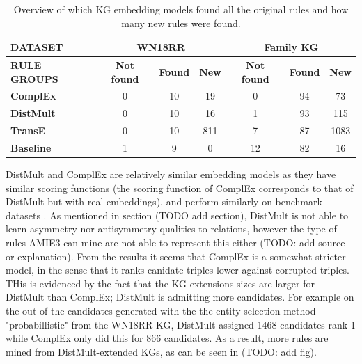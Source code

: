 \begin{table}[h]
\begin{tabular}{|l|ccc||ccc|}
\hline
{\textbf{DATASET}}   & \multicolumn{3}{c||}{\textbf{WN18RR}}                                                                              & \multicolumn{3}{c|}{\textbf{Family KG}}                                                           \\ \hline
{\textbf{RULE GROUPS}}   & \multicolumn{1}{c|}{\textbf{Not found}} & \multicolumn{1}{c|}{\textbf{Found}} & \multicolumn{1}{c||}{\textbf{New}} & \multicolumn{1}{c|}{\textbf{Not found}} & \multicolumn{1}{c|}{\textbf{Found}} & \multicolumn{1}{c|}{\textbf{New}} \\ \hline
\textbf{ComplEx}  & \multicolumn{1}{c|}{0}                  & \multicolumn{1}{c|}{10}             & \multicolumn{1}{c||}{19}           & \multicolumn{1}{c|}{0}                  & \multicolumn{1}{c|}{94}             & \multicolumn{1}{c|}{73}           \\ \hline
\textbf{DistMult} & \multicolumn{1}{c|}{0}                     & \multicolumn{1}{c|}{10}                                  & 16                                & \multicolumn{1}{c|}{1}         & \multicolumn{1}{c|}{93}          & 115                               \\ \hline
\textbf{TransE}   & \multicolumn{1}{c|}{0}         & \multicolumn{1}{c|}{10}                     & 811                               & \multicolumn{1}{c|}{7}       & \multicolumn{1}{c|}{87}      & 1083                              \\ \hline
\textbf{Baseline} & \multicolumn{1}{c|}{1}     & \multicolumn{1}{c|}{9}                   & 0                                 & \multicolumn{1}{c|}{12}       & \multicolumn{1}{c|}{82}         & 16                                \\ \hline
\end{tabular}
\caption{Overview of which KG embedding models found all the original rules and how many new rules were found.}
\end{table}

DistMult and ComplEx are relatively similar embedding models as they have similar scoring functions (the scoring function of ComplEx corresponds to that of DistMult but with real embeddings), and perform similarly on benchmark datasets \cite{complEx}. As mentioned in section (TODO add section), DistMult is not able to learn asymmetry nor antisymmetry qualities to relations, however the type of rules AMIE3 can mine are not able to represent this either (TODO: add source or explanation). From the results it seems that ComplEx is a somewhat stricter model, in the sense that it ranks canidate triples lower against corrupted triples. THis is evidenced by the fact that the KG extensions sizes are larger for DistMult than ComplEx; DistMult is admitting more candidates. For example on the out of the candidates generated with the the entity selection method "probabillistic" from the WN18RR KG, DistMult assigned 1468 candidates rank 1 while ComplEx only did this for 866 candidates. As a result, more rules are mined from DistMult-extended KGs, as can be seen in (TODO: add fig). 

